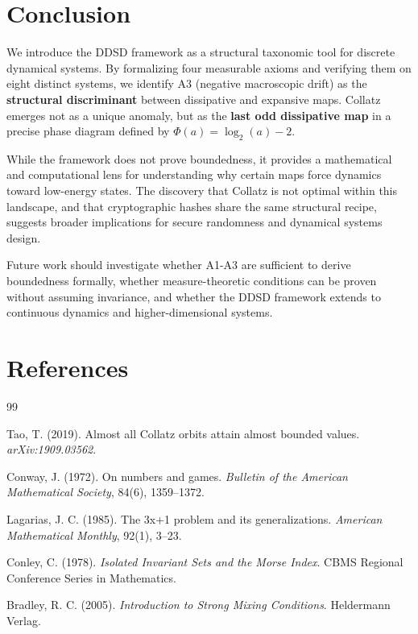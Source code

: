 \documentclass[11pt,a4paper]{article}
\theoremstyle{plain}
\theoremstyle{definition}
\theoremstyle{remark}
\begin{document}
\section{Conclusion}
\label{sec:conclusion}

We introduce the DDSD framework as a structural taxonomic tool for discrete dynamical systems. By formalizing four measurable axioms and verifying them on eight distinct systems, we identify A3 (negative macroscopic drift) as the \textbf{structural discriminant} between dissipative and expansive maps. Collatz emerges not as a unique anomaly, but as the \textbf{last odd dissipative map} in a precise phase diagram defined by $\Phi(a) = \log_2(a) - 2$.

While the framework does not prove boundedness, it provides a mathematical and computational lens for understanding why certain maps force dynamics toward low-energy states. The discovery that Collatz is not optimal within this landscape, and that cryptographic hashes share the same structural recipe, suggests broader implications for secure randomness and dynamical systems design.

Future work should investigate whether A1-A3 are sufficient to derive boundedness formally, whether measure-theoretic conditions can be proven without assuming invariance, and whether the DDSD framework extends to continuous dynamics and higher-dimensional systems.

\newpage
\section*{References}

\begin{thebibliography}{99}

Tao, T. (2019).
\newblock Almost all Collatz orbits attain almost bounded values.
\newblock \textit{arXiv:1909.03562}.

Conway, J. (1972).
\newblock On numbers and games.
\newblock \textit{Bulletin of the American Mathematical Society}, 84(6), 1359--1372.

Lagarias, J. C. (1985).
\newblock The 3x+1 problem and its generalizations.
\newblock \textit{American Mathematical Monthly}, 92(1), 3--23.

Conley, C. (1978).
\newblock \textit{Isolated Invariant Sets and the Morse Index}.
\newblock CBMS Regional Conference Series in Mathematics.

Bradley, R. C. (2005).
\newblock \textit{Introduction to Strong Mixing Conditions}.
\newblock Heldermann Verlag.

\end{thebibliography}
\end{document}
